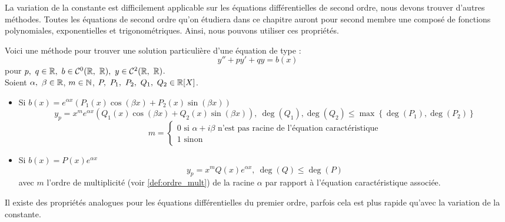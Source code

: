 \par La variation de la constante est difficilement applicable sur les équations différentielles de second ordre, nous devons trouver d'autres méthodes.
Toutes les équations de second ordre qu'on étudiera dans ce chapitre auront pour second membre une composé de fonctions polynomiales, exponentielles et trigonométriques. Ainsi, nous pouvons utiliser ces propriétés.
\\
\par Voici une méthode pour trouver une solution particulière d'une équation de type :
    \[ y'' + py' + qy = b(x) \]
    pour $p,\ q \in \mathbb{R},\ b \in \mathcal{C}^0(\mathbb{R},\  \mathbb{R}),\ y \in \mathcal{C}^2(\mathbb{R},\ \mathbb{R})$. \\
    Soient $\alpha,\ \beta \in \mathbb{R}$, $m \in \mathbb{N}$, $P,\ P_1,\ P_2,\ Q_1,\ Q_2 \in \R[X]$. 
    \begin{itemize}
        \item \cite{exo7_analyse1} Si $b(x) = e^{\alpha x}(P_1(x) \cos(\beta x) + P_2(x) \sin(\beta x) )$
        \[y_{p} = x^{m} e^{\alpha x}(Q_1(x) \cos(\beta x) + Q_2(x) \sin(\beta x)) ,\ \deg(Q_1), \deg(Q_2) \leq \max\left\{ \deg(P_1), \deg(P_2) \right\} \]
        \[ m = \begin{cases}
            0 \text{ si } \alpha + i\beta \text{ n'est pas racine de l'équation caractéristique} \\
            1 \text{ sinon}
        \end{cases} \]
        \item Si $b(x) = P(x) e^{\alpha x}$ 
        \[ y_p = x^m Q(x)e^{\alpha x},\ \deg(Q) \leq \deg(P) \]
        avec $m$ l'ordre de multiplicité (voir \autoref{def:ordre_mult}) de la racine $\alpha$ par rapport à l'équation caractéristique associée.
\end{itemize}

\begin{remark}
    Il existe des propriétés analogues pour les équations différentielles du premier ordre, parfois cela est plus rapide qu'avec la variation de la constante.
\end{remark}

